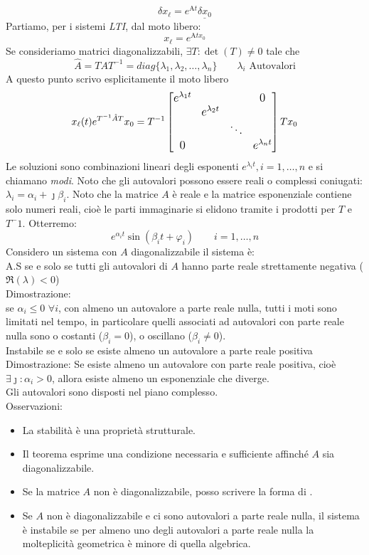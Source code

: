 	\[\delta x_\ell = e^{\text{A}t}\underline{\delta x_0}\]
	Partiamo, per i sistemi \emph{LTI}, dal moto libero:
	\[x_\ell = e^{\text{A}tx_0}\]
	Se consideriamo matrici diagonalizzabili, $ \exists T: \det(T) \not=0 $ tale che 
	\[\hat{A} = TAT^{-1} = diag\{\lambda_1, \lambda_2,\dots,\lambda_n\} \qquad \lambda_i \text{ Autovalori}\]
	A questo punto scrivo esplicitamente il moto libero
	\[x_\ell(t) e^{T^{-1}\hat{A}T}x_0 = T^{-1}\large\left[\begin{matrix}
		e^{\lambda_1t} & && 0\\
		& e^{\lambda_2t}&&  \\
		& & \ddots&\\
		0 & & & e^{\lambda_nt}
	\end{matrix}\large\right] T x_0\] 
	Le soluzioni sono combinazioni lineari degli esponenti $ e^{\lambda_it} ,i =1,\dots,n$ e si chiamano \emph{modi}. Noto che gli autovalori possono essere reali o complessi coniugati: $ \lambda_i =\alpha_i +\jmath\beta_i $. Noto che la matrice $ A $ è reale e la matrice esponenziale contiene solo numeri reali, cioè le parti immaginarie si elidono tramite i prodotti per $ T $ e $ T^-1 $. Otterremo:
	\begin{equation*}
		\boxed{e^{\alpha_it}\sin(\beta_it+\varphi_i)}\qquad i=1,\dots,n
	\end{equation*}
	Considero un sistema con $ A $ diagonalizzabile il sistema è:\\
	\colorbox{bluePoli!20}{A.S se e solo se tutti gli autovalori di $ A $ hanno parte reale strettamente negativa ($\Re(\lambda)<0$)}\\
	Dimostrazione:\\
	se $ \alpha_i\leq0 \,\,\forall i $, con almeno un autovalore a parte reale nulla, tutti i moti sono limitati nel tempo, in particolare quelli associati ad autovalori con parte reale nulla sono o costanti ($ \beta_i = 0 $), o oscillano ($ \beta_i \not=0 $).\\
	\colorbox{bluePoli!20}{Instabile se e solo se esiste almeno un autovalore a parte reale positiva}\\
	Dimostrazione:
	Se esiste almeno un autovalore con parte reale positiva, cioè $ \exists \jmath : \alpha_i>0 $, allora esiste almeno un esponenziale che diverge.\\
	Gli autovalori sono disposti nel piano complesso.\\
	Osservazioni:
	\begin{itemize}
		\item La stabilità è una proprietà strutturale.
		\item Il teorema esprime una condizione necessaria e sufficiente affinché $ A $ sia diagonalizzabile.
		\item Se la matrice $ A $ non è diagonalizzabile, posso scrivere la forma di .
		\item Se $ A $ non è diagonalizzabile e ci sono autovalori a parte reale nulla, il sistema è instabile se per almeno uno degli autovalori a parte reale nulla la molteplicità geometrica è minore di quella algebrica.
	\end{itemize}

